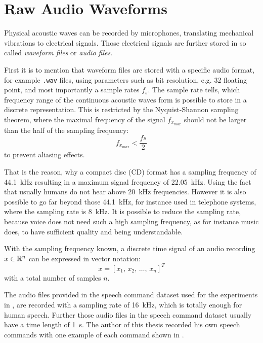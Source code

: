 
\section{Raw Audio Waveforms}\label{sec:raw_audio}\label{sec:signal_raw}
Physical acoustic waves can be recorded by microphones, translating mechanical vibrations to electrical signals. 
Those electrical signals are further stored in so called \emph{waveform files} or \emph{audio files}.

First it is to mention that waveform files are stored with a specific audio format, for example \texttt{.wav} files, using parameters such as bit resolution, e.g. \SI{32}{\bit} floating point, and most importantly a sample rates $f_s$. 
The sample rate tells, which frequency range of the continuous acoustic waves form is possible to store in a discrete representation.
This is restricted by the Nyquist-Shannon sampling theorem, where the maximal frequency of the signal $f_{x_{max}}$ should not be larger than the half of the sampling frequency: 
\begin{equation}\label{eq:signal_raw_nyquist}
  f_{x_{max}} < \frac{fs}{2}
\end{equation}
to prevent aliasing effects.

That is the reason, why a compact disc (CD) format has a sampling frequency of \SI{44.1}{\kilo\hertz} resulting in a maximum signal frequency of \SI{22.05}{\kilo\hertz}.
Using the fact that usually humans do not hear above \SI{20}{\kilo\hertz} frequencies.
However it is also possible to go far beyond those \SI{44.1}{\kilo\hertz}, for instance used in telephone systems, where the sampling rate is \SI{8}{\kilo\hertz}.
It is possible to reduce the sampling rate, because voice does not need such a high sampling frequency, as for instance music does, to have sufficient quality and being understandable.

With the sampling frequency known, a discrete time signal of an audio recording $x \in \mathbb{R}^n$ can be expressed in vector notation:
\begin{equation}\label{eq:signal_raw_x}
  x = [x_1,\, x_2,\, \dots,\, x_n]^T
\end{equation}
with a total number of samples $n$.

The audio files provided in the speech command dataset \cite{Warden2018} used for the experiments in , are recorded with a sampling rate of \SI{16}{\kilo\hertz}, which is totally enough for human speech.
Further those audio files in the speech command dataset usually have a time length of \SI{1}{\second}.
The author of this thesis recorded his own speech commands with one example of each command shown in .

